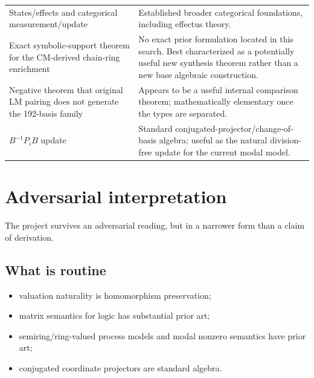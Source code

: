 \documentclass[11pt]{article}
\theoremstyle{definition}
\begin{document}
\begin{longtable}{p{}p{}}
\addlinespace
States/effects and categorical measurement/update & Established broader categorical foundations, including effectus theory.\\
\addlinespace
Exact symbolic-support theorem for the CM-derived chain-ring enrichment & No exact prior formulation located in this search. Best characterized as a potentially useful new synthesis theorem rather than a new base algebraic construction.\\
\addlinespace
Negative theorem that original LM pairing does not generate the 192-basis family & Appears to be a useful internal comparison theorem; mathematically elementary once the types are separated.\\
\addlinespace
\(B^{-1}P_iB\) update & Standard conjugated-projector/change-of-basis algebra; useful as the natural division-free update for the current modal model.\\
\bottomrule
\end{longtable}

\section{Adversarial interpretation}

The project survives an adversarial reading, but in a narrower form than a claim of derivation.

\subsection{What is routine}
\begin{itemize}
\item valuation naturality is homomorphism preservation;
\item matrix semantics for logic has substantial prior art;
\item semiring/ring-valued process models and modal nonzero semantics have prior art;
\item conjugated coordinate projectors are standard algebra.
\end{itemize}
\end{document}
